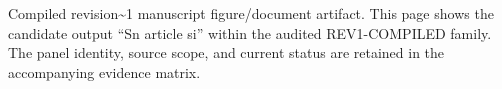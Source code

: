 Compiled revision\textasciitilde{}1 manuscript figure/document artifact. This page shows the candidate output ``Sn article si'' within the audited REV1-COMPILED family. The panel identity, source scope, and current status are retained in the accompanying evidence matrix.
